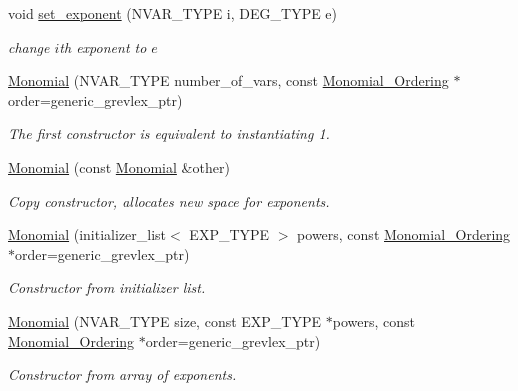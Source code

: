 \begin{Indent}
\begin{DoxyCompactItemize}
\mbox{\label{group__polygroup_a6f28aa6d15979b018003908937155052}} 
void \hyperlink{group__polygroup_a6f28aa6d15979b018003908937155052}{set\+\_\+exponent} (N\+V\+A\+R\+\_\+\+T\+Y\+PE i, D\+E\+G\+\_\+\+T\+Y\+PE e)
\begin{DoxyCompactList}\small\item\em change $i$th exponent to $e$ \end{DoxyCompactList}\item 
\mbox{\label{group__polygroup_a3c710f9d6f7c7e0addc2779a037042dd}} 
\hyperlink{group__polygroup_a3c710f9d6f7c7e0addc2779a037042dd}{Monomial} (N\+V\+A\+R\+\_\+\+T\+Y\+PE number\+\_\+of\+\_\+vars, const \hyperlink{group__orderinggroup_class_monomial___ordering}{Monomial\+\_\+\+Ordering} $\ast$order=generic\+\_\+grevlex\+\_\+ptr)
\begin{DoxyCompactList}\small\item\em The first constructor is equivalent to instantiating 1. \end{DoxyCompactList}\item 
\mbox{\label{group__polygroup_ad6968b542cf22f8bc24053fb48782dcc}} 
\hyperlink{group__polygroup_ad6968b542cf22f8bc24053fb48782dcc}{Monomial} (const \hyperlink{group__polygroup_class_monomial}{Monomial} \&other)
\begin{DoxyCompactList}\small\item\em Copy constructor, allocates new space for exponents. \end{DoxyCompactList}\item 
\hyperlink{group__polygroup_a8b9c7bc9d5b286adb11ccc39471b00c4}{Monomial} (initializer\+\_\+list$<$ E\+X\+P\+\_\+\+T\+Y\+PE $>$ powers, const \hyperlink{group__orderinggroup_class_monomial___ordering}{Monomial\+\_\+\+Ordering} $\ast$order=generic\+\_\+grevlex\+\_\+ptr)
\begin{DoxyCompactList}\small\item\em Constructor from initializer list. \end{DoxyCompactList}\item 
\hyperlink{group__polygroup_a85d91b1a13592c849394c26c5ad294d8}{Monomial} (N\+V\+A\+R\+\_\+\+T\+Y\+PE size, const E\+X\+P\+\_\+\+T\+Y\+PE $\ast$powers, const \hyperlink{group__orderinggroup_class_monomial___ordering}{Monomial\+\_\+\+Ordering} $\ast$order=generic\+\_\+grevlex\+\_\+ptr)
\begin{DoxyCompactList}\small\item\em Constructor from array of exponents. \end{DoxyCompactList}\end{DoxyCompactItemize}
\end{Indent}
